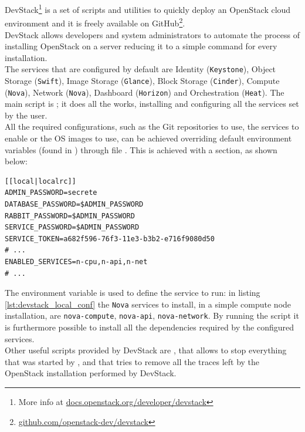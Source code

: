 DevStack\footnote{More info at \url{docs.openstack.org/developer/devstack}} is a set of scripts and utilities to quickly deploy an OpenStack cloud environment and it is freely available on GitHub\footnote{\url{github.com/openstack-dev/devstack}}.\\
DevStack allows developers and system administrators to automate the process of installing OpenStack on a server reducing it to a simple command for every installation.\\
The services that are configured by default are Identity (\texttt{Keystone}), Object Storage (\texttt{Swift}), Image Storage (\texttt{Glance}), Block Storage (\texttt{Cinder}), Compute (\texttt{Nova}), Network (\texttt{Nova}), Dashboard (\texttt{Horizon}) and Orchestration (\texttt{Heat}).
The main script is ; it does all the works, installing and configuring all the services set by the user.\\
All the required configurations, such as the Git repositories to use, the services to enable or the OS images to use, can be achieved overriding default environment variables (found in ) through file . This is achieved with a  section, as shown below:
\begin{lstlisting}[numbers=none,caption=Sample of a \texttt{local.conf},label={lst:devstack_local_conf}]
[[local|localrc]]
ADMIN_PASSWORD=secrete
DATABASE_PASSWORD=$ADMIN_PASSWORD
RABBIT_PASSWORD=$ADMIN_PASSWORD
SERVICE_PASSWORD=$ADMIN_PASSWORD
SERVICE_TOKEN=a682f596-76f3-11e3-b3b2-e716f9080d50
# ...
ENABLED_SERVICES=n-cpu,n-api,n-net
# ...
\end{lstlisting}
The environment variable  is used to define the service to run: in listing \ref{lst:devstack_local_conf} the \texttt{Nova} services to install, in a simple compute node installation, are \texttt{nova-compute}, \texttt{nova-api}, \texttt{nova-network}.
By running the script  it is furthermore possible to install all the dependencies required by the configured services.\\
Other useful scripts provided by DevStack are , that allows to stop everything that was started by , and  that tries to remove all the traces left by the OpenStack installation performed by DevStack.
